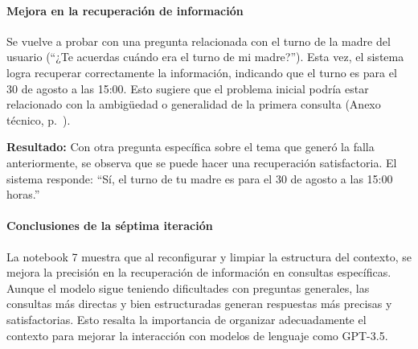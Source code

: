 \paragraph{Mejora en la recuperación de información}

Se vuelve a probar con una pregunta relacionada con el turno de la madre del usuario (``¿Te acuerdas cuándo era el turno de mi madre?''). Esta vez, el sistema logra recuperar correctamente la información, indicando que el turno es para el 30 de agosto a las 15:00. Esto sugiere que el problema inicial podría estar relacionado con la ambigüedad o generalidad de la primera consulta (Anexo técnico, p.~\pageref{anexo:code-4-1-7-6}).

\textbf{Resultado:} Con otra pregunta específica sobre el tema que generó la falla anteriormente, se observa que se puede hacer una recuperación satisfactoria. El sistema responde: ``Sí, el turno de tu madre es para el 30 de agosto a las 15:00 horas.''

\paragraph{Conclusiones de la séptima iteración}

La notebook 7 muestra que al reconfigurar y limpiar la estructura del contexto, se mejora la precisión en la recuperación de información en consultas específicas. Aunque el modelo sigue teniendo dificultades con preguntas generales, las consultas más directas y bien estructuradas generan respuestas más precisas y satisfactorias. Esto resalta la importancia de organizar adecuadamente el contexto para mejorar la interacción con modelos de lenguaje como GPT-3.5. 